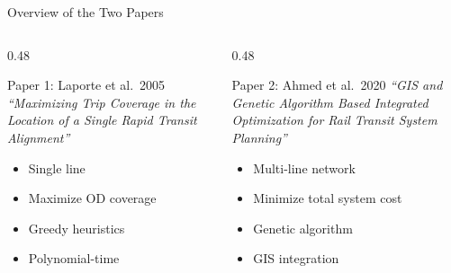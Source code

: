 \documentclass[aspectratio=169, 11pt]{beamer}
\begin{document}
\begin{frame}{Overview of the Two Papers}

\begin{columns}[T]
\begin{column}{0.48\textwidth}
\begin{block}{Paper 1: Laporte et al.\ 2005}
\small
\textit{``Maximizing Trip Coverage in the Location of a Single Rapid Transit Alignment''}
\begin{itemize}
    \item Single line
    \item Maximize OD coverage
    \item Greedy heuristics
    \item Polynomial-time
\end{itemize}
\end{block}
\end{column}
\begin{column}{0.48\textwidth}
\begin{block}{Paper 2: Ahmed et al.\ 2020}
\small
\textit{``GIS and Genetic Algorithm Based Integrated Optimization for Rail Transit System Planning''}
\begin{itemize}
    \item Multi-line network
    \item Minimize total system cost
    \item Genetic algorithm
    \item GIS integration
\end{itemize}
\end{block}
\end{column}
\end{columns}
\end{frame}
\end{document}
